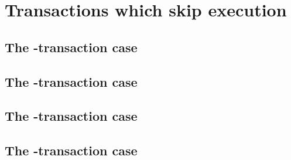 
\section{Transactions which skip \evm{} execution \lispTodo{}}
\subsection{The \sysi{}-transaction          case} \label{hub: tx skip: sysi} 
\subsection{The \user{}-transaction          case} \label{hub: tx skip: user} 
\subsection{The \sysf{}-transaction          case} \label{hub: tx skip: sysf} 
\subsection{The \systemTxnNoop{}-transaction case} \label{hub: tx skip: sysi} 
